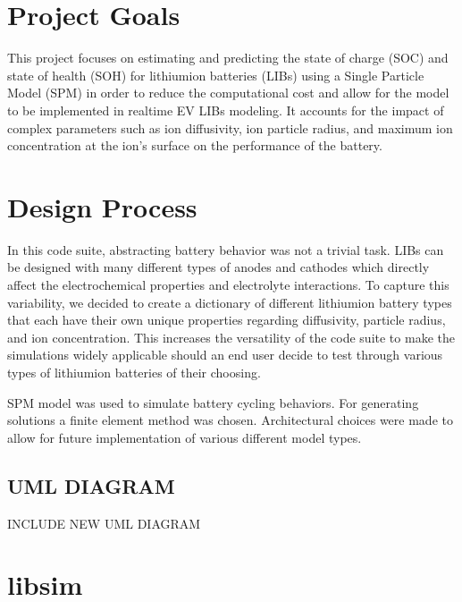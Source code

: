 \documentclass[letterpaper,10pt,english]{sphinxmanual}
\begin{document}
\chapter{Project Goals}
\label{\detokenize{project_goals:project-goals}}\label{\detokenize{project_goals::doc}}
\sphinxAtStartPar
This project focuses on estimating and predicting the state of charge (SOC)
and state of health (SOH) for lithium\sphinxhyphen{}ion batteries (LIBs) using a Single
Particle Model (SPM) in order to reduce the computational cost and allow
for the model to be implemented in real\sphinxhyphen{}time EV LIBs modeling. It accounts
for the impact of complex parameters such as ion diffusivity, ion particle
radius, and maximum ion concentration at the ion’s surface on the
performance of the battery.


\chapter{Design Process}
\label{\detokenize{design_process:design-process}}\label{\detokenize{design_process::doc}}
\sphinxAtStartPar
In this code suite, abstracting battery behavior was not a trivial task.
LIBs can be designed with many different types of anodes and cathodes
which directly affect the electro\sphinxhyphen{}chemical properties and electrolyte
interactions. To capture this variability, we decided to create a
dictionary of different lithium\sphinxhyphen{}ion battery types that each have
their own unique properties regarding diffusivity, particle radius,
and ion concentration. This increases the versatility of the code
suite to make the simulations widely applicable should an end user
decide to test through various types of lithium\sphinxhyphen{}ion batteries of
their choosing.

\sphinxAtStartPar
SPM model was used to simulate battery cycling behaviors. For
generating solutions a finite element method was chosen.
Architectural choices were made to allow for future
implementation of various different model types.


\section{UML DIAGRAM}
\label{\detokenize{design_process:uml-diagram}}
\sphinxAtStartPar
INCLUDE NEW UML DIAGRAM


\chapter{libsim}
\label{\detokenize{modules:libsim}}\label{\detokenize{modules::doc}}
\end{document}
